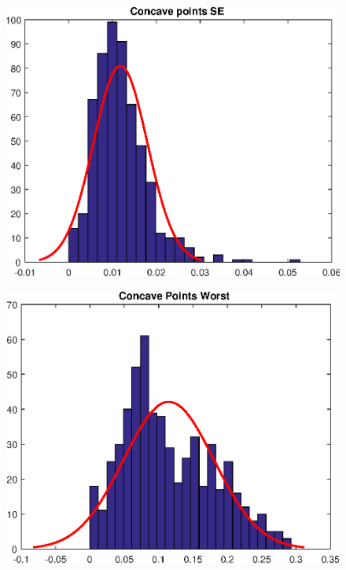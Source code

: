 \documentclass[11pt,a4paper]{article}
\numberwithin{equation}{section}
\begin{document}
\begin{itemize}
\begin{figure}[H]
\centering
\begin{minipage}{.4\textwidth}
  \centering
  \includegraphics[width=\linewidth]{./img/concave_points_se}
  \label{fig:test1}
\end{minipage}%
\begin{minipage}{.4\textwidth}
  \centering
  \includegraphics[width=\linewidth]{./img/concave_points_worst}
  \label{fig:test2}
\end{minipage}
\end{figure}


\end{itemize}
\end{document}
